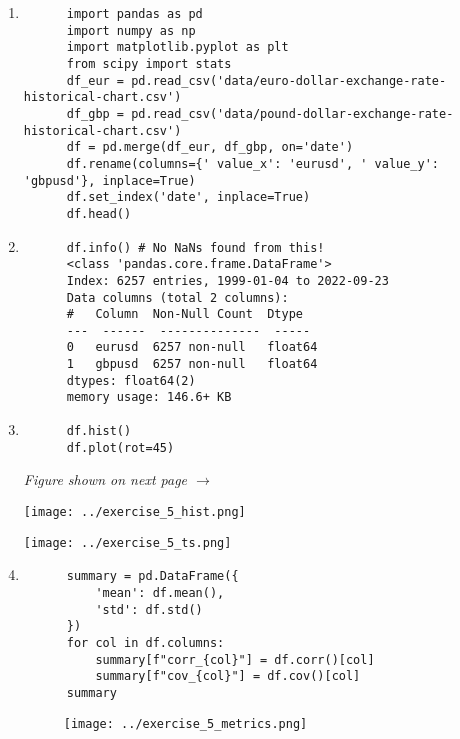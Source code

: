 \documentclass[11pt]{article}
\begin{document}
\begin{enumerate}
    \item 
    \leavevmode
      \begin{lstlisting}
      import pandas as pd
      import numpy as np
      import matplotlib.pyplot as plt
      from scipy import stats
      df_eur = pd.read_csv('data/euro-dollar-exchange-rate-historical-chart.csv')
      df_gbp = pd.read_csv('data/pound-dollar-exchange-rate-historical-chart.csv')
      df = pd.merge(df_eur, df_gbp, on='date')
      df.rename(columns={' value_x': 'eurusd', ' value_y': 'gbpusd'}, inplace=True)
      df.set_index('date', inplace=True)
      df.head()
      \end{lstlisting}
    \item 
    \leavevmode
      \begin{lstlisting}
      df.info() # No NaNs found from this!
      <class 'pandas.core.frame.DataFrame'>
      Index: 6257 entries, 1999-01-04 to 2022-09-23
      Data columns (total 2 columns):
      #   Column  Non-Null Count  Dtype  
      ---  ------  --------------  -----  
      0   eurusd  6257 non-null   float64
      1   gbpusd  6257 non-null   float64
      dtypes: float64(2)
      memory usage: 146.6+ KB
      \end{lstlisting}
    \item 
    \leavevmode
      \begin{lstlisting}
      df.hist()
      df.plot(rot=45)
      \end{lstlisting}

    \vfill
    \begin{center}
        \textit{Figure shown on next page $\rightarrow$}
    \end{center}
    \newpage

    \noindent
    \begin{minipage}[t]{0.48\textwidth}
        \texttt{[image: ../exercise\_5\_hist.png]}
    \end{minipage}%
    \hfill
    \begin{minipage}[t]{0.48\textwidth}
        \texttt{[image: ../exercise\_5\_ts.png]}
    \end{minipage}

    \item 
    \leavevmode
      \begin{lstlisting}
      summary = pd.DataFrame({
          'mean': df.mean(),
          'std': df.std()
      })
      for col in df.columns:
          summary[f"corr_{col}"] = df.corr()[col]
          summary[f"cov_{col}"] = df.cov()[col]
      summary
      \end{lstlisting}
      \begin{figure}[h!]
        \centering
        \texttt{[image: ../exercise\_5\_metrics.png]}
      \end{figure}


\end{enumerate}
\end{document}
